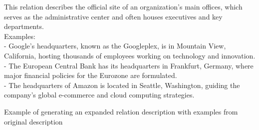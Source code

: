 \begin{table*}[ht]
\begin{mdframed}[linewidth=1pt]
        This relation describes the official site of an organization's main offices, which serves as the administrative center and often houses executives and key departments.\\
        Examples: \\
        - Google's headquarters, known as the Googleplex, is in Mountain View, California, hosting thousands of employees working on technology and innovation. \\
        - The European Central Bank has its headquarters in Frankfurt, Germany, where major financial policies for the Eurozone are formulated. \\
        - The headquarters of Amazon is located in Seattle, Washington, guiding the company's global e-commerce and cloud computing strategies.
    \end{mdframed}

    \caption{Example of generating an expanded relation description with examples from original description}
    \label{tab:relation_description_prompt1}
\end{table*}



